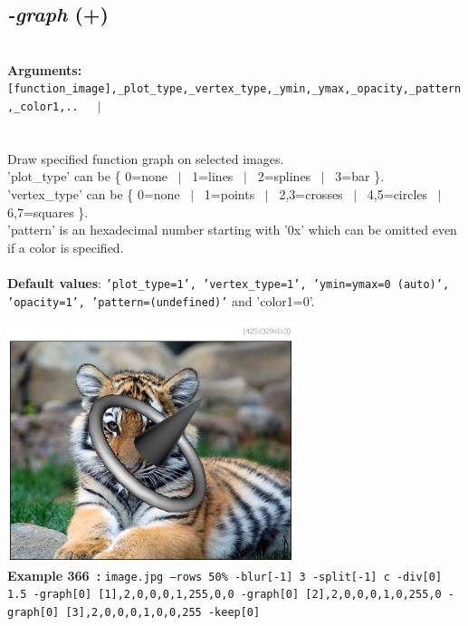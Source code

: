 \documentclass[a4paper,11pt,twoside]{book}
\begin{document}
\subsection{\emph{-graph} (+)}\vspace*{-0.5em}
~\\\textbf{Arguments: } 
{\small \texttt{[function\_image],\_plot\_type,\_vertex\_type,\_ymin,\_ymax,\_opacity,\_pattern,\_color1,..}}~~~$|$\\
\\~\\
Draw specified function graph on selected images.
~\\'plot\_type' can be \{ 0=none ~$|$~ 1=lines ~$|$~ 2=splines ~$|$~ 3=bar \}.
~\\'vertex\_type' can be \{ 0=none ~$|$~ 1=points ~$|$~ 2,3=crosses ~$|$~ 4,5=circles ~$|$~ 6,7=squares \}.
~\\'pattern' is an hexadecimal number starting with '0x' which can be omitted
even if a color is specified.
~\\~\\\textbf{Default values}: {\small \texttt{'plot\_type=1', 'vertex\_type=1', 'ymin=ymax=0 (auto)', 'opacity=1', 'pattern=(undefined)'}}
and 'color1=0'.
\begin{center}\includegraphics[keepaspectratio=true,height=7cm,width=\textwidth]{img/gmic_def366.jpg}\\
{\footnotesize \textbf{Example 366~:} \texttt{image.jpg --rows 50\% -blur[-1] 3 -split[-1] c -div[0] 1.5 -graph[0] [1],2,0,0,0,1,255,0,0 -graph[0] [2],2,0,0,0,1,0,255,0 -graph[0] [3],2,0,0,0,1,0,0,255 -keep[0]}}
\end{center}
\end{document}

